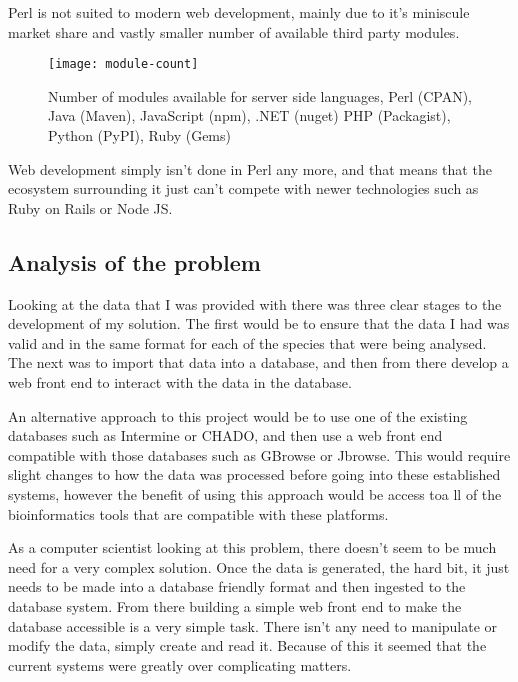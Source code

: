 Perl is not suited to modern web development, mainly due to it's miniscule market share\cite{perl-market} and vastly smaller number of available third party modules. 

\begin{figure}[ht!]
\begin{center}
\texttt{[image: module-count]}
\caption{Number of modules available for server side languages, Perl (CPAN), Java (Maven), JavaScript (npm), .NET (nuget) PHP (Packagist), Python (PyPI), Ruby (Gems)\cite{modulecounts}}
\end{center}
\end{figure}

Web development simply isn't done in Perl any more, and that means that the ecosystem surrounding it just can't compete with newer technologies such as Ruby on Rails or Node JS.

\subsection{Analysis of the problem}
Looking at the data that I was provided with there was three clear stages to the development of my solution. The first would be to ensure that the data I had was valid and in the same format for each of the species that were being analysed. The next was to import that data into a database, and then from there develop a web front end to interact with the data in the database. 

An alternative approach to this project would be to use one of the existing databases such as Intermine\cite{intermine} or CHADO\cite{chado}, and then use a web front end compatible with those databases such as GBrowse\cite{gbrowse} or Jbrowse\cite{jbrowse}. This would require slight changes to how the data was processed before going into these established systems, however the benefit of using this approach would be access toa ll of the bioinformatics tools that are compatible with these platforms.

As a computer scientist looking at this problem, there doesn't seem to be much need for a very complex solution. Once the data is generated, the hard bit, it just needs to be made into a database friendly format and then ingested to the database system. From there building a simple web front end to make the database accessible is a very simple task. There isn't any need to manipulate or modify the data, simply create and read it. Because of this it seemed that the current systems were greatly over complicating matters.

